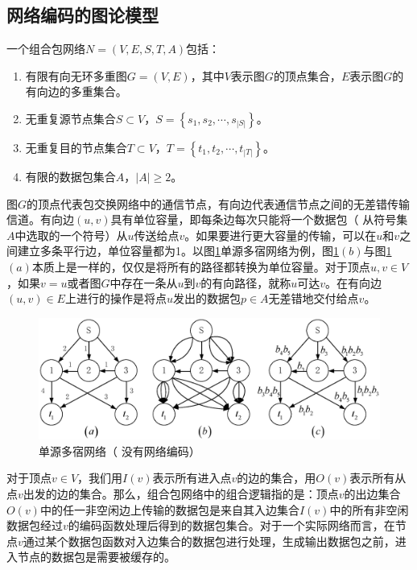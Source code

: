 \subsection{网络编码的图论模型}
一个组合包网络$N=(V,E,S,T,A)$包括：
\begin{enumerate}[fullwidth,itemindent=2em,label=(\arabic*)]
	\item 有限有向无环多重图$G=(V,E)$，其中$V$表示图$G$的顶点集合，$E$表示图$G$的有向边的多重集合。
	\item 无重复源节点集合$S \subset V$，$S = \left\{ {{s_1},{s_2}, \cdots ,{s_{\left| S \right|}}} \right\}$。
	\item 无重复目的节点集合$T \subset V$，$T = \left\{ {{t_1},{t_2}, \cdots ,{t_{\left| T \right|}}} \right\}$。
	\item 有限的数据包集合$A$，$\left| A \right| \ge 2$。
\end{enumerate}
\par
图$G$的顶点代表包交换网络中的通信节点，有向边代表通信节点之间的无差错传输信道。有向边$(u,v)$具有单位容量，即每条边每次只能将一个数据包（ 从符号集$A$中选取的一个符号）从$u$传送给点$v$。如果要进行更大容量的传输，可以在$u$和$v$之间建立多条平行边，单位容量都为1。以图\ref{TULUNMOXING_EPS}单源多宿网络为例，图\ref{TULUNMOXING_EPS}$\left(b\right)$与图\ref{TULUNMOXING_EPS}$(a)$本质上是一样的，仅仅是将所有的路径都转换为单位容量。对于顶点$u,v \in V$，如果$v=u$或者图$G$中存在一条从$u$到$v$的有向路径，就称$u$可达$v$。在有向边$\left(u,v\right) \in E$上进行的操作是将点$u$发出的数据包$p \in A$无差错地交付给点$v$。
\begin{figure}[htbp]
	\centering
	\includegraphics[width=6in]{figures/tulunmoxing.eps}
	\caption{单源多宿网络（ 没有网络编码）}
	\label{TULUNMOXING_EPS}
\end{figure}
\par
对于顶点$v \in V$，我们用$I\left( v \right)$表示所有进入点$v$的边的集合，用$O\left( v \right)$表示所有从点$v$出发的边的集合。那么，组合包网络中的组合逻辑指的是：顶点$v$的出边集合$O\left( v \right)$中的任一非空闲边上传输的数据包是来自其入边集合$I\left( v \right)$中的所有非空闲数据包经过$v$的编码函数处理后得到的数据包集合。对于一个实际网络而言，在节点$v$通过某个数据包函数对入边集合的数据包进行处理，生成输出数据包之前，进入节点的数据包是需要被缓存的。

